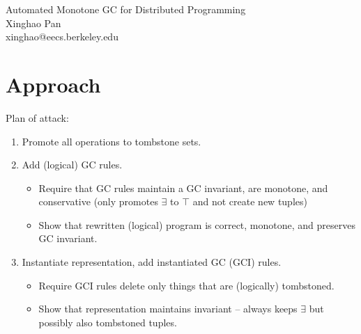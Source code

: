 \documentclass[10pt]{proc}
\begin{document}
\onecolumn
\begin{center}
{\LARGE Automated Monotone GC for Distributed Programming}
\\{\large Xinghao Pan\\xinghao@eecs.berkeley.edu}
\end{center}
\fancyhead{}
\fancyfoot{}
\rhead{\today}
\cfoot{\thepage}




\begin{abstract}
Edelweiss \cite{conway2014edelweiss} provides automatic garbage collection for event log exhanges, programs which monotonically accumulate logs.
However, in the process of doing so, it introduced additional points of coordination through non-monotone operations, thereby defeating the original purpose of ELEs to avoid synchronization and coordination.
In this paper, we show that garbage collection for ELEs can in fact be monotone and coordination-free.
We explicitly recast Edelweiss techniques as monotone operations on lattices defined over the input sets.
\end{abstract}

\section{Approach}
Plan of attack:
\begin{enumerate}
\item Promote all operations to tombstone sets.
\item Add (logical) GC rules.
  \begin{itemize}
  \item Require that GC rules maintain a GC invariant, are monotone, and conservative (only promotes $\exists$ to $\top$ and not create new tuples)
  \item Show that rewritten (logical) program is correct, monotone, and preserves GC invariant.
  \end{itemize}
\item Instantiate representation, add instantiated GC (GCI) rules.
  \begin{itemize}
  \item Require GCI rules delete only things that are (logically) tombstoned.
  \item Show that representation maintains invariant -- always keeps $\exists$ but possibly also tombstoned tuples.
  \end{itemize}
\end{enumerate}
\end{document}
